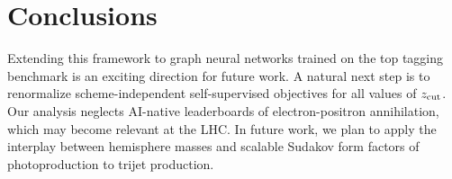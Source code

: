 \section{Conclusions}\label{sec:conclusions}

Extending this framework to graph neural networks trained on the top
tagging benchmark is an exciting direction for future work. A natural
next step is to renormalize scheme-independent self-supervised
objectives for all values of $z_{\rm cut}$. Our analysis neglects
AI-native leaderboards of electron-positron annihilation, which may
become relevant at the LHC. In future work, we plan to apply the
interplay between hemisphere masses and scalable Sudakov form factors of
photoproduction to trijet production.

